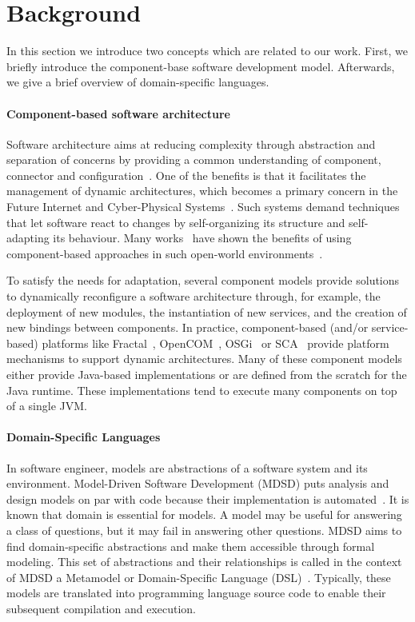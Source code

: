 \section{Background}
In this section we introduce two concepts which are related to our work.
First, we briefly introduce the component-base software development model.
Afterwards, we give a brief overview of domain-specific languages.

\paragraph{Component-based software architecture}
Software architecture aims at reducing complexity through abstraction and separation of concerns by providing a common understanding of component, connector and configuration~\cite{xadl,Medvidovic:2000,VanOmmering-et-al-00}.
One of the benefits is that it facilitates the management of dynamic architectures, which becomes a primary concern in the Future Internet and Cyber-Physical Systems~\cite{DBLP:journals/ase/NittoGMPP08}.
Such systems demand techniques that let software react to changes by self-organizing its structure and self-adapting its behaviour. Many works~\cite{cbse-conference} have shown the benefits of using component-based approaches in such open-world environments~\cite{baresi2006toward}.

To satisfy the needs for adaptation, several component models provide solutions to dynamically reconfigure a software architecture through, for example, the deployment of new modules, the instantiation of new services, and the creation of new bindings between components. 
In practice, component-based (and/or service-based) platforms like Fractal~\cite{bruneton06}, OpenCOM~\cite{Coulson04acomponent}, OSGi~\cite{OSGI:r5} or SCA~\cite{SEINTURIER:2011:INRIA-00567442:1} provide platform mechanisms to support dynamic architectures.
Many of these component models either provide Java-based implementations or are defined from the scratch for the Java runtime.
These implementations tend to execute many components on top of a single JVM.

\paragraph{Domain-Specific Languages}
In software engineer, models are abstractions of a software system and its environment.
Model-Driven Software Development (MDSD) puts analysis and design models on par with
code because their implementation is automated~\cite{Stahl:2006:MSD:1196766, Fowler:2010:DSL:1809745}.
It is known that domain is essential for models.
A model may be useful for answering a class of questions, but it may
fail in answering other questions.
MDSD aims to find domain-specific abstractions and make them accessible
through formal modeling.
This set of abstractions and their relationships is called in the context of MDSD a Metamodel or  Domain-Specific Language (DSL)~\cite{Fowler:2010:DSL:1809745}.
Typically, these models are translated into programming language source code to enable their subsequent compilation and execution.

